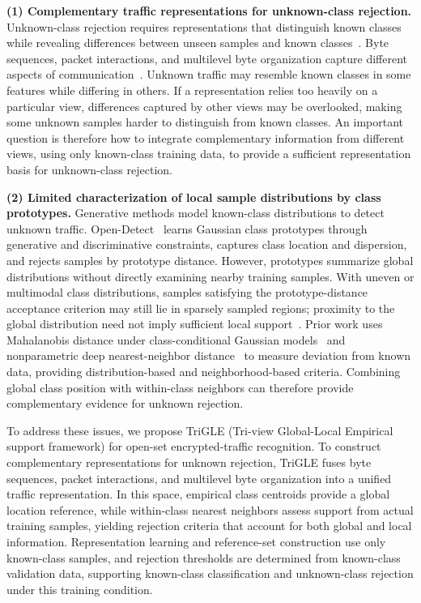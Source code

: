 \documentclass[journal]{IEEEtran}
\newcommand{\bluecite}[1]{\textcolor{blue}{\cite{#1}}}
\begin{document}
\noindent\textbf{(1) Complementary traffic representations for unknown-class rejection.} Unknown-class rejection requires representations that distinguish known classes while revealing differences between unseen samples and known classes~\bluecite{csi}. Byte sequences, packet interactions, and multilevel byte organization capture different aspects of communication~\bluecite{ch2-2,ch2-5,ch2-4}. Unknown traffic may resemble known classes in some features while differing in others. If a representation relies too heavily on a particular view, differences captured by other views may be overlooked, making some unknown samples harder to distinguish from known classes. An important question is therefore how to integrate complementary information from different views, using only known-class training data, to provide a sufficient representation basis for unknown-class rejection.

\noindent\textbf{(2) Limited characterization of local sample distributions by class prototypes.} Generative methods model known-class distributions to detect unknown traffic. Open-Detect~\bluecite{ch2-15} learns Gaussian class prototypes through generative and discriminative constraints, captures class location and dispersion, and rejects samples by prototype distance. However, prototypes summarize global distributions without directly examining nearby training samples. With uneven or multimodal class distributions, samples satisfying the prototype-distance acceptance criterion may still lie in sparsely sampled regions; proximity to the global distribution need not imply sufficient local support~\bluecite{lof}. Prior work uses Mahalanobis distance under class-conditional Gaussian models~\bluecite{classic-mahalanobis} and nonparametric deep nearest-neighbor distance~\bluecite{classic-knn} to measure deviation from known data, providing distribution-based and neighborhood-based criteria. Combining global class position with within-class neighbors can therefore provide complementary evidence for unknown rejection.

To address these issues, we propose TriGLE (Tri-view Global-Local Empirical support framework) for open-set encrypted-traffic recognition. To construct complementary representations for unknown rejection, TriGLE fuses byte sequences, packet interactions, and multilevel byte organization into a unified traffic representation. In this space, empirical class centroids provide a global location reference, while within-class nearest neighbors assess support from actual training samples, yielding rejection criteria that account for both global and local information. Representation learning and reference-set construction use only known-class samples, and rejection thresholds are determined from known-class validation data, supporting known-class classification and unknown-class rejection under this training condition.
\end{document}
